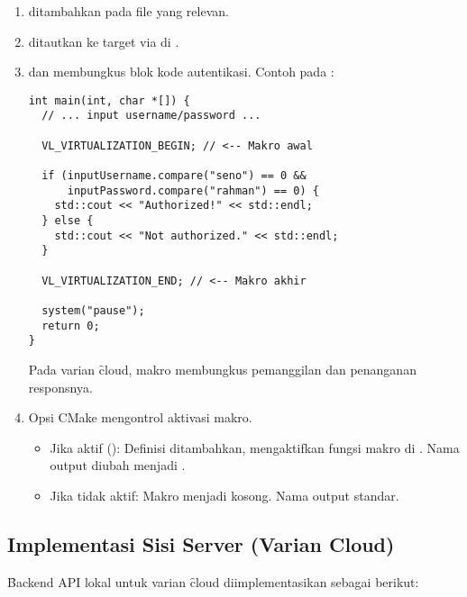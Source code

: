 \begin{enumerate}
    \item {}  ditambahkan pada file  yang relevan.
    \item {}  ditautkan ke target via  di .
    \item {}  dan  membungkus blok kode autentikasi. Contoh pada :
          \begin{verbatim}
int main(int, char *[]) {
  // ... input username/password ...

  VL_VIRTUALIZATION_BEGIN; // <-- Makro awal

  if (inputUsername.compare("seno") == 0 &&
      inputPassword.compare("rahman") == 0) {
    std::cout << "Authorized!" << std::endl;
  } else {
    std::cout << "Not authorized." << std::endl;
  }

  VL_VIRTUALIZATION_END; // <-- Makro akhir

  system("pause");
  return 0;
}
          \end{verbatim}
          Pada varian \f{cloud}, makro membungkus pemanggilan  dan penanganan responsnya.
    \item {} Opsi CMake  mengontrol aktivasi makro.
        \begin{itemize}
            \item Jika aktif (): Definisi  ditambahkan, mengaktifkan fungsi makro di . Nama output diubah menjadi .
            \item Jika tidak aktif: Makro menjadi kosong. Nama output standar.
        \end{itemize}
\end{enumerate}

\subsection{Implementasi Sisi Server (Varian Cloud)}
\f{Backend} API lokal untuk varian \f{cloud} diimplementasikan sebagai berikut:

